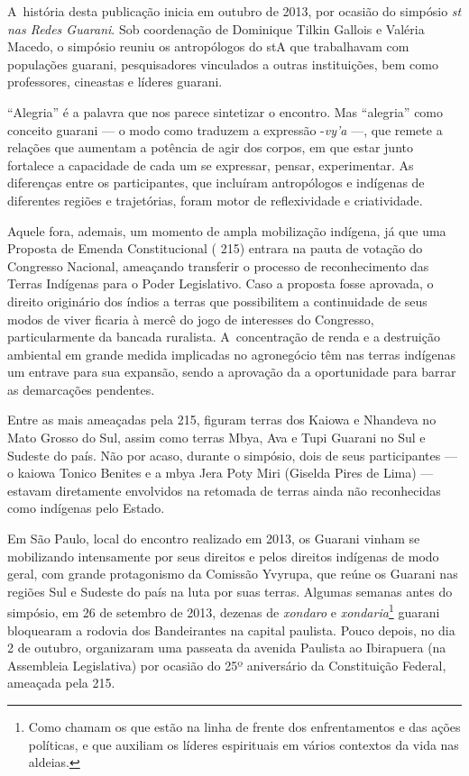 A~história desta publicação inicia em outubro de 2013, por ocasião do
simpósio \emph{st nas Redes Guarani}. Sob coordenação de Dominique Tilkin
Gallois e Valéria Macedo, o simpósio reuniu os antropólogos do stA
que trabalhavam com populações guarani, pesquisadores vinculados a
outras instituições, bem como professores, cineastas e líderes guarani.

``Alegria'' é a palavra que nos parece sintetizar o encontro. Mas ``alegria''
como conceito guarani --- o modo como traduzem a expressão -\emph{vy’a} ---, que
remete a relações que aumentam a potência de agir dos corpos, em que
estar junto fortalece a capacidade de cada um se expressar, pensar,
experimentar. As diferenças entre os participantes, que incluíram
antropólogos e indígenas de diferentes regiões e trajetórias, foram
motor de reflexividade e criatividade.

Aquele fora, ademais, um momento de ampla mobilização indígena, já que
uma Proposta de Emenda Constitucional ( 215) entrara na pauta de
votação do Congresso Nacional, ameaçando transferir o processo de
reconhecimento das Terras Indígenas para o Poder Legislativo. Caso a
proposta fosse aprovada, o direito originário dos índios a terras que
possibilitem a continuidade de seus modos de viver ficaria à mercê do
jogo de interesses do Congresso, particularmente da bancada ruralista.
A~concentração de renda e a destruição ambiental em grande medida
implicadas no agronegócio têm nas terras indígenas um entrave para sua
expansão, sendo a aprovação da  a oportunidade para barrar as
demarcações pendentes.

Entre as mais ameaçadas pela  215, figuram terras dos Kaiowa e
Nhandeva no Mato Grosso do Sul, assim como terras Mbya, Ava e Tupi
Guarani no Sul e Sudeste do país. Não por acaso, durante o simpósio,
dois de seus participantes --- o kaiowa Tonico Benites e a mbya Jera Poty
Miri (Giselda Pires de Lima) --- estavam diretamente envolvidos na
retomada de terras ainda não reconhecidas como indígenas pelo Estado. 

Em São Paulo, local do encontro realizado em 2013, os Guarani vinham se
mobilizando intensamente por seus direitos e pelos direitos indígenas
de modo geral, com grande protagonismo da Comissão Yvyrupa, que reúne
os Guarani nas regiões Sul e Sudeste do país na luta por suas terras.
Algumas semanas antes do simpósio, em 26 de setembro de 2013, dezenas
de \emph{xondaro} e \emph{xondaria}\footnote{Como chamam os que estão na linha de
frente dos enfrentamentos e das ações políticas, e que auxiliam os
líderes espirituais em vários contextos da vida nas aldeias.} guarani
bloquearam a rodovia dos Bandeirantes na capital paulista. Pouco
depois, no dia 2 de outubro, organizaram uma passeata da avenida
Paulista ao Ibirapuera (na Assembleia Legislativa) por ocasião do 25º
aniversário da Constituição Federal, ameaçada pela  215. 

